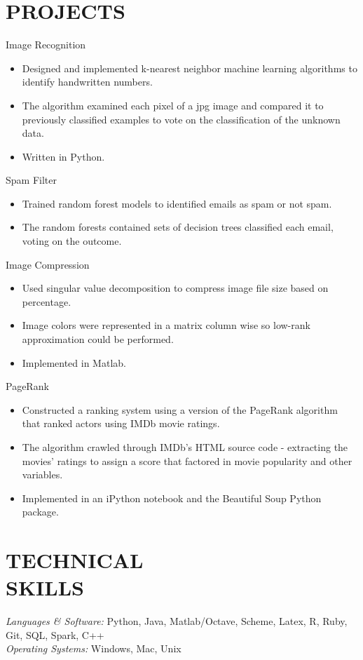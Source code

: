 \documentclass[resmargin, 6pt]{res} %
\begin{document}
\begin{resume}

\section{PROJECTS}Image Recognition
		\begin{itemize} \itemsep -2pt
		\item Designed and implemented k-nearest neighbor machine learning algorithms to identify handwritten numbers.
		\item The algorithm examined each pixel of a jpg image and compared it to previously classified examples to vote on the classification of the unknown data.
		\item Written in Python.
		\end{itemize}
		Spam Filter
		\begin{itemize} \itemsep -2pt
		\item Trained random forest models to identified emails as spam or not spam.
		\item The random forests contained sets of decision trees classified each email, voting on the outcome.
		\end{itemize}
		Image Compression
		\begin{itemize} \itemsep -2pt
		\item Used singular value decomposition to compress image file size based on percentage.
		\item Image colors were represented in a matrix column wise so low-rank approximation could be performed.
		\item Implemented in Matlab.
		\end{itemize}
		PageRank
		\begin{itemize} \itemsep -2pt
		\item Constructed a ranking system using a version of the PageRank algorithm that ranked actors using IMDb movie ratings.  
		\item The algorithm crawled through IMDb’s HTML source code - extracting the movies’ ratings to assign a score that factored in movie popularity and other variables.
		\item Implemented in an iPython notebook and the Beautiful Soup Python package.
		\end{itemize}

\section{TECHNICAL \\ SKILLS} {\sl Languages \& Software:} Python, Java, Matlab/Octave, 
         Scheme, Latex, R, Ruby, Git, SQL, Spark, C++\\
                {\sl Operating Systems:} Windows, Mac, Unix\\
								

\end{resume}
\end{document}
